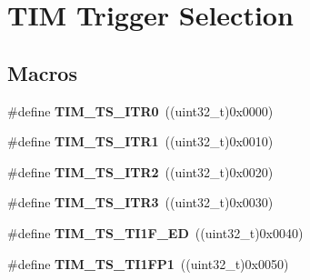 \hypertarget{group___t_i_m___trigger___selection}{}\section{T\+IM Trigger Selection}
\label{group___t_i_m___trigger___selection}
\subsection*{Macros}
\begin{DoxyCompactItemize}
\item 
\#define {\bfseries T\+I\+M\+\_\+\+T\+S\+\_\+\+I\+T\+R0}~((uint32\+\_\+t)0x0000)\hypertarget{group___t_i_m___trigger___selection_gab7cf2b7db3956d4fd1e5a5d84f4891e7}{}\label{group___t_i_m___trigger___selection_gab7cf2b7db3956d4fd1e5a5d84f4891e7}

\item 
\#define {\bfseries T\+I\+M\+\_\+\+T\+S\+\_\+\+I\+T\+R1}~((uint32\+\_\+t)0x0010)\hypertarget{group___t_i_m___trigger___selection_gad90fbca297153ca9c0112a67ea2c6cb3}{}\label{group___t_i_m___trigger___selection_gad90fbca297153ca9c0112a67ea2c6cb3}

\item 
\#define {\bfseries T\+I\+M\+\_\+\+T\+S\+\_\+\+I\+T\+R2}~((uint32\+\_\+t)0x0020)\hypertarget{group___t_i_m___trigger___selection_ga8599ba58a5f911d648503c7ac55d4320}{}\label{group___t_i_m___trigger___selection_ga8599ba58a5f911d648503c7ac55d4320}

\item 
\#define {\bfseries T\+I\+M\+\_\+\+T\+S\+\_\+\+I\+T\+R3}~((uint32\+\_\+t)0x0030)\hypertarget{group___t_i_m___trigger___selection_ga63183e611b91c5847040172c0069514d}{}\label{group___t_i_m___trigger___selection_ga63183e611b91c5847040172c0069514d}

\item 
\#define {\bfseries T\+I\+M\+\_\+\+T\+S\+\_\+\+T\+I1\+F\+\_\+\+ED}~((uint32\+\_\+t)0x0040)\hypertarget{group___t_i_m___trigger___selection_ga8c89554efc693e679c94b5a749af123c}{}\label{group___t_i_m___trigger___selection_ga8c89554efc693e679c94b5a749af123c}

\item 
\#define {\bfseries T\+I\+M\+\_\+\+T\+S\+\_\+\+T\+I1\+F\+P1}~((uint32\+\_\+t)0x0050)\hypertarget{group___t_i_m___trigger___selection_ga38d3514d54bcdb0ea8ac8bd91c5832b5}{}\label{group___t_i_m___trigger___selection_ga38d3514d54bcdb0ea8ac8bd91c5832b5}


\end{DoxyCompactItemize}
